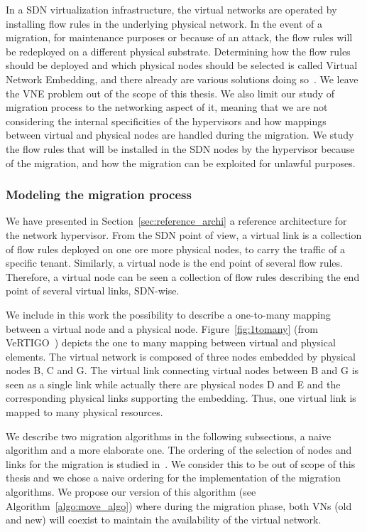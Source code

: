 \label{sec:migration}
In a SDN virtualization infrastructure, the virtual networks are operated by installing flow rules in the underlying physical network.
In the event of a migration, for maintenance purposes or because of an attack, the flow rules will be redeployed on a different physical substrate.
Determining how the flow rules should be deployed and which physical nodes should be selected is called Virtual Network Embedding, and there already are various solutions doing so~\cite{Zangiabady2017e, Papagianni2013, Chowdhury2016d, Wang2015}.
We leave the VNE problem out of the scope of this thesis.
We also limit our study of migration process to the networking aspect of it, meaning that we are not considering the internal specificities of the hypervisors and how mappings between virtual and physical nodes are handled during the migration.
We study the flow rules that will be installed in the SDN nodes by the hypervisor because of the migration, and how the migration can be exploited for unlawful purposes.


\subsubsection{Modeling the migration process}
We have presented in Section~\ref{sec:reference_archi} a reference architecture for the network hypervisor.
From the SDN point of view, a virtual link is a collection of flow rules deployed on one ore more physical nodes, to carry the traffic of a specific tenant.
Similarly, a virtual node is the end point of several flow rules.
Therefore, a virtual node can be seen a collection of flow rules describing the end point of several virtual links, SDN-wise.

We include in this work the possibility to describe a one-to-many mapping between a virtual node and a physical node.
Figure~\ref{fig:1tomany} (from VeRTIGO~\cite{VeRTIGO-Corin2012a}) depicts the one to many mapping between virtual and physical elements. The virtual network is composed of three nodes embedded by physical nodes B, C and G.
The virtual link connecting virtual nodes between B and G is seen as a single link while actually there are physical nodes D and E and the corresponding physical links supporting the embedding.
Thus, one virtual link is mapped to many physical resources.

We describe two migration algorithms in the following subsections, a naive algorithm and a more elaborate one. 
The ordering of the selection of nodes and links for the migration is studied in~\cite{vnm-lo2013}. 
We consider this to be out of scope of this thesis and we chose a naive ordering for the implementation of the migration algorithms.
We propose our version of this algorithm (see Algorithm~\ref{algo:move_algo}) where during the migration phase, both VNs (old and new) will coexist to maintain the availability of the virtual network.


